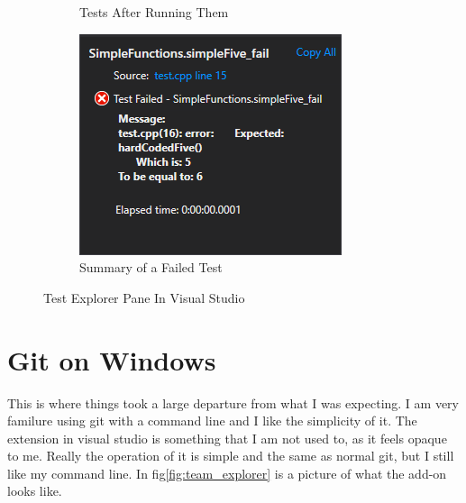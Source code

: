 \documentclass[12pt]{article}
\begin{document}
\begin{figure}[!ht]
\begin{subfigure}[t]{0.45\textwidth}
		\caption{Tests After Running Them}
	\end{subfigure}
	\begin{subfigure}[t]{0.45\textwidth}
		\includegraphics[width=\textwidth]{failed_test_summary.png}
		\caption{Summary of a Failed Test}
	\end{subfigure}
	\caption{Test Explorer Pane In Visual Studio}
	\label{fig:test_explorer}
\end{figure}

\clearpage
\section{Git on Windows}

This is where things took a large departure from what I was expecting.
I am very familure using git with a command line and I like the simplicity of it.
The extension in visual studio is something that I am not used to, as it feels opaque to me.
Really the operation of it is simple and the same as normal git, but I still like my command line.
In fig\ref{fig:team_explorer} is a picture of what the add-on looks like.
\end{document}
